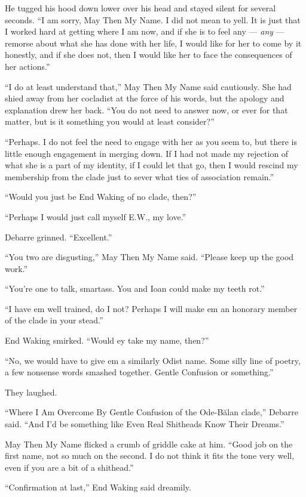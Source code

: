 He tugged his hood down lower over his head and stayed silent for several seconds. ``I am sorry, May Then My Name. I did not mean to yell. It is just that I worked hard at getting where I am now, and if she is to feel any — \emph{any} — remorse about what she has done with her life, I would like for her to come by it honestly, and if she does not, then I would like her to face the consequences of her actions.''

``I do at least understand that,'' May Then My Name said cautiously. She had shied away from her cocladist at the force of his words, but the apology and explanation drew her back. ``You do not need to answer now, or ever for that matter, but is it something you would at least consider?''

``Perhaps. I do not feel the need to engage with her as you seem to, but there is little enough engagement in merging down. If I had not made my rejection of what she is a part of my identity, if I could let that go, then I would rescind my membership from the clade just to sever what ties of association remain.''

``Would you just be End Waking of no clade, then?''

``Perhaps I would just call myself E.W., my love.''

Debarre grinned. ``Excellent.''

``You two are disgusting,'' May Then My Name said. ``Please keep up the good work.''

``You're one to talk, smartass. You and Ioan could make my teeth rot.''

``I have em well trained, do I not? Perhaps I will make em an honorary member of the clade in your stead.''

End Waking smirked. ``Would ey take my name, then?''

``No, we would have to give em a similarly Odist name. Some silly line of poetry, a few nonsense words smashed together. Gentle Confusion or something.''

They laughed.

``Where I Am Overcome By Gentle Confusion of the Ode-Bălan clade,'' Debarre said. ``And I'd be something like Even Real Shitheads Know Their Dreams.''

May Then My Name flicked a crumb of griddle cake at him. ``Good job on the first name, not so much on the second. I do not think it fits the tone very well, even if you are a bit of a shithead.''

``Confirmation at last,'' End Waking said dreamily.

